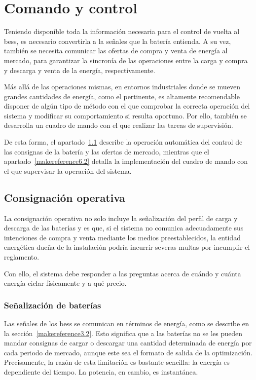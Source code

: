 \cleardoublepage

\chapter{Comando y control}
\label{makereference6}

Teniendo disponible toda la información necesaria para el control de vuelta al \gls{bess}, es necesario convertirla a la señales que la batería entienda. A su vez, también se necesita comunicar las ofertas de compra y venta de energía al mercado, para garantizar la sincronía de las operaciones entre la carga y compra y descarga y venta de la energía, respectivamente.

Más allá de las operaciones mismas, en entornos industriales donde se mueven grandes cantidades de energía, como el pertinente, es altamente recomendable disponer de algún tipo de método con el que comprobar la correcta operación del sistema y modificar su comportamiento si resulta oportuno. Por ello, también se desarrolla un cuadro de mando con el que realizar las tareas de supervisión.

De esta forma, el apartado~\ref{makereference6.1} describe la operación automática del control de las consignas de la batería y las ofertas de mercado, mientras que el apartado~\ref{makereference6.2} detalla la implementación del cuadro de mando con el que supervisar la operación del sistema.

\section{Consignación operativa}
\label{makereference6.1}

La consignación operativa no solo incluye la señalización del perfil de carga y descarga de las baterías y es que, si el sistema no comunica adecuadamente sus intenciones de compra y venta mediante los medios preestablecidos, la entidad energética dueña de la instalación podría incurrir severas multas por incumplir el reglamento.

Con ello, el sistema debe responder a las preguntas acerca de cuándo y cuánta energía ciclar físicamente y a qué precio.

\subsection{Señalización de baterías}
\label{makereference6.1.1}

Las señales de los \gls{bess} se comunican en términos de energía, como se describe en la sección~\ref{makereference3.2}. Esto significa que a las baterías no se les pueden mandar consignas de cargar o descargar una cantidad determinada de energía por cada periodo de mercado, aunque este sea el formato de salida de la optimización. Precisamente, la razón de esta limitación es bastante sencilla: la energía es dependiente del tiempo. La potencia, en cambio, es instantánea.

